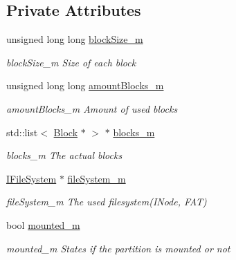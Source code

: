 \subsection*{Private Attributes}
\begin{DoxyCompactItemize}
\item 
\mbox{\label{classcore_1_1logic_1_1_partition_a57332acda5675a2f957f9dae15cb95ce}} 
unsigned long long \mbox{\hyperlink{classcore_1_1logic_1_1_partition_a57332acda5675a2f957f9dae15cb95ce}{block\+Size\+\_\+m}}
\begin{DoxyCompactList}\small\item\em block\+Size\+\_\+m Size of each block \end{DoxyCompactList}\item 
\mbox{\label{classcore_1_1logic_1_1_partition_a373c1aa0747a05cf2cce5e52f45190f0}} 
unsigned long long \mbox{\hyperlink{classcore_1_1logic_1_1_partition_a373c1aa0747a05cf2cce5e52f45190f0}{amount\+Blocks\+\_\+m}}
\begin{DoxyCompactList}\small\item\em amount\+Blocks\+\_\+m Amount of used blocks \end{DoxyCompactList}\item 
\mbox{\label{classcore_1_1logic_1_1_partition_a46f21abe3e81b2abf000c7d7c745d9dd}} 
std\+::list$<$ \mbox{\hyperlink{classcore_1_1logic_1_1_block}{Block}} $\ast$ $>$ $\ast$ \mbox{\hyperlink{classcore_1_1logic_1_1_partition_a46f21abe3e81b2abf000c7d7c745d9dd}{blocks\+\_\+m}}
\begin{DoxyCompactList}\small\item\em blocks\+\_\+m The actual blocks \end{DoxyCompactList}\item 
\mbox{\label{classcore_1_1logic_1_1_partition_a7f3c15de42e1b59f74f216cd382545d4}} 
\mbox{\hyperlink{classcore_1_1_i_file_system}{I\+File\+System}} $\ast$ \mbox{\hyperlink{classcore_1_1logic_1_1_partition_a7f3c15de42e1b59f74f216cd382545d4}{file\+System\+\_\+m}}
\begin{DoxyCompactList}\small\item\em file\+System\+\_\+m The used filesystem(\+I\+Node, F\+A\+T) \end{DoxyCompactList}\item 
\mbox{\label{classcore_1_1logic_1_1_partition_a1d5f9ed9365a32e9b78b6d9329b80b04}} 
bool \mbox{\hyperlink{classcore_1_1logic_1_1_partition_a1d5f9ed9365a32e9b78b6d9329b80b04}{mounted\+\_\+m}}
\begin{DoxyCompactList}\small\item\em mounted\+\_\+m States if the partition is mounted or not \end{DoxyCompactList}\end{DoxyCompactItemize}
